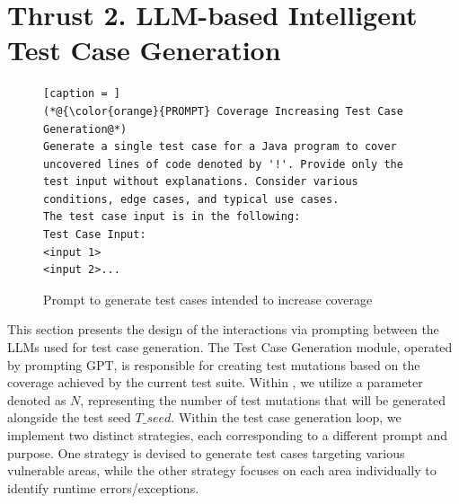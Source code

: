 \section{Thrust 2. LLM-based Intelligent Test Case Generation}





\begin{figure}
  \centering
\begin{lstlisting}[caption = ]
(*@{\color{orange}{PROMPT} Coverage Increasing Test Case Generation@*)
Generate a single test case for a Java program to cover uncovered lines of code denoted by '!'. Provide only the test input without explanations. Consider various conditions, edge cases, and typical use cases.
The test case input is in the following:
Test Case Input:
<input 1>
<input 2>...
\end{lstlisting}
\vspace{-6pt}
\caption{Prompt to generate test cases intended to increase coverage}
\label{fig:cov-prompt}
\end{figure}


This section presents the design of the interactions via prompting
between the LLMs used for test case generation.
The Test Case Generation module, operated by prompting GPT, is
responsible for creating test mutations based on the coverage achieved
by the current test suite. Within {\tool}, we utilize a parameter
denoted as $N$, representing the number of test mutations
that will be generated alongside the test seed $T\_seed$. Within the
test case generation loop,
we implement two distinct strategies, each corresponding to a
different prompt and purpose. One strategy is devised to generate test
cases targeting various vulnerable areas, while the other strategy
focuses on each area individually to identify runtime
errors/exceptions.


